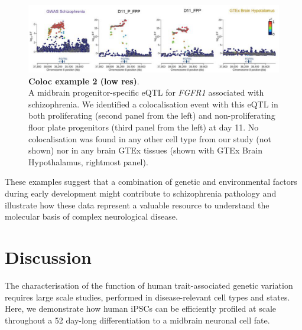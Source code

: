 \begin{figure}[h]
\centering
\includegraphics[width=16cm]{Chapter5/Fig/neuroseq_coloc_example2_FGFR1.png}
\caption[Coloc example 2]{\textbf{Coloc example 2 (low res)}.\\
A midbrain progenitor-specific eQTL for \textit{FGFR1} associated with schizophrenia. 
We identified a colocalisation event with this eQTL in both proliferating (second panel from the left) and non-proliferating floor plate progenitors (third panel from the left) at day 11. 
No colocalisation was found in any other cell type from our study (not shown) nor in any brain GTEx tissues (shown with GTEx Brain Hypothalamus, rightmost panel).}
\label{fig:neuroseq_coloc_example2}
\end{figure}

\newpage

These examples suggest that a combination of genetic and environmental factors during early development might contribute to schizophrenia pathology and illustrate how these data represent a valuable resource to understand the molecular basis of complex neurological disease.

\clearpage

\section{Discussion}
\label{sec:neuroseq_discussion}





The characterisation of the function of human trait-associated genetic variation requires large scale studies, performed in disease-relevant cell types and states. 
Here, we demonstrate how human iPSCs can be efficiently profiled at scale throughout a 52 day-long differentiation to a midbrain neuronal cell fate. \\

